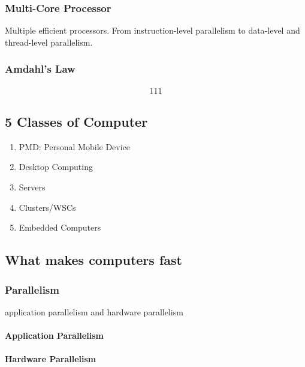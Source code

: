 \subsubsection{Multi-Core Processor}
Multiple efficient processors. From instruction-level parallelism to data-level and thread-level parallelism. 

\subsubsection{Amdahl's Law}
\begin{align*}
    111
\end{align*}

\subsection{5 Classes of Computer}
\begin{enumerate}
    \item PMD: Personal Mobile Device
    \item Desktop Computing
    \item Servers
    \item Clusters/WSCs
    \item Embedded Computers
\end{enumerate}



\subsection{What makes computers fast}
\subsubsection{Parallelism}
application parallelism and hardware parallelism

\paragraph{Application Parallelism}


\paragraph{Hardware Parallelism}